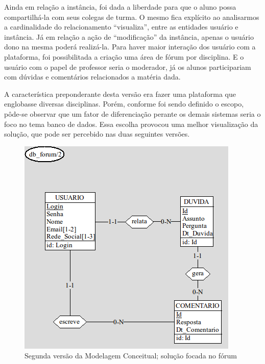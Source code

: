 \documentclass[graduacao,brazil]{ThesisPUC}
\begin{document}
Ainda em rela\c{c}\~{a}o a inst\^{a}ncia, foi dada a liberdade para que o aluno possa compartilh\'{a}-la
com seus colegas de turma. O mesmo fica expl\'{i}cito ao analisarmos a cardinalidade do
relacionamento “visualiza”, entre as entidades usu\'{a}rio e inst\^{a}ncia. J\'{a} em rela\c{c}\~{a}o a a\c{c}\~{a}o de
“modifica\c{c}\~{a}o” da inst\^{a}ncia, apenas o usu\'{a}rio dono na mesma poder\'{a} realiz\'{a}-la.
Para haver maior intera\c{c}\~{a}o dos usu\'{a}rio com a plataforma, foi possibilitada a cria\c{c}\~{a}o uma
\'{a}rea de f\'{o}rum por disciplina. E o usu\'{a}rio com o papel de professor seria o moderador, j\'{a} os alunos
participariam com d\'{u}vidas e coment\'{a}rios relacionados a mat\'{e}ria dada.

A caracter\'{i}stica preponderante desta vers\~{a}o era fazer uma plataforma que englobasse
diversas disciplinas. Por\'{e}m, conforme foi sendo definido o escopo, p\^{o}de-se observar que um fator
de diferencia\c{c}\~{a}o perante os demais sistemas seria o foco no tema banco de dados. Essa escolha
provocou uma melhor visualiza\c{c}\~{a}o da solu\c{c}\~{a}o, que pode ser percebido nas duas seguintes
vers\~{o}es.

\begin{figure}[H]
    \centering
    \includegraphics[width=\linewidth]{Imagens/ModelagemConceitual_forum_v1_1.png}
    \caption{Segunda vers\~{a}o da Modelagem Conceitual; solu\c{c}\~{a}o focada no f\'{o}rum}
\end{figure}
\end{document}
